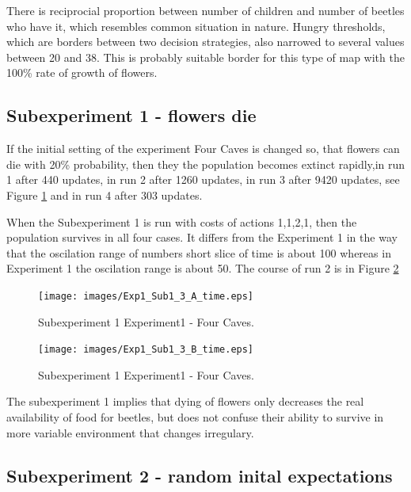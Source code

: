 \documentclass[a4paper,12pt]{report}
\begin{document}
There is reciprocial proportion between number of children and number of beetles who have it, which resembles common situation in nature. Hungry thresholds, which are borders between two decision strategies, also narrowed to several values between 20 and 38. This is probably suitable border for this type of map with the 100\% rate of growth of flowers.

\subsection{Subexperiment 1 - flowers die}

If the initial setting of the experiment Four Caves is changed so, that flowers can die with 20\% probability, then they the population becomes extinct rapidly,in run 1 after 440 updates, in run 2 after 1260 updates, in run 3 after 9420 updates, see Figure \ref{img.Exp1_Sub1_3_A_time} and in run 4 after 303 updates. 

When the Subexperiment 1 is run with costs of actions 1,1,2,1, then the population survives in all four cases. It differs from the Experiment 1 in the way that the oscilation range of numbers short slice of time is about 100 whereas in Experiment 1 the oscilation range is about 50. The course of run 2 is in Figure \ref{img.Exp1_Sub1_3_B_time}

\begin{figure}
\begin{center}
  \texttt{[image: images/Exp1\_Sub1\_3\_A\_time.eps]}
  \caption{Subexperiment 1 Experiment1 - Four Caves.}
  \label{img.Exp1_Sub1_3_A_time}
\end{center}
\end{figure}

\begin{figure}
\begin{center}
  \texttt{[image: images/Exp1\_Sub1\_3\_B\_time.eps]}
  \caption{Subexperiment 1 Experiment1 - Four Caves.}
  \label{img.Exp1_Sub1_3_B_time}
\end{center}
\end{figure}

The subexperiment 1 implies that dying of flowers only decreases the real availability of food for beetles, but does not confuse their ability to survive in more variable environment that changes irregulary.

\subsection{Subexperiment 2 - random inital expectations}
\end{document}
